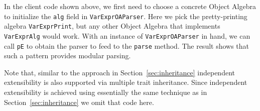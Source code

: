 In the client code shown above, we first need to choose a concrete
Object Algebra to initialize the \lstinline{alg} field in \lstinline{VarExprOAParser}. Here we pick the
pretty-printing algebra \lstinline{VarExprPrint}, but any other Object
Algebra that implements \lstinline{VarExprAlg} would work.
With an instance of \lstinline{VarExprOAParser} in hand, we can call
\lstinline{pE} to obtain the parser to feed to the \lstinline{parse} method.
The result shows that such a pattern provides modular parsing.

Note that, similar to the approach in Section~\ref{sec:inheritance} independent extensibility is also supported via multiple trait inheritance.
Since independent extensibility is achieved using essentially the same technique as in Section~\ref{sec:inheritance} we omit that code here.

